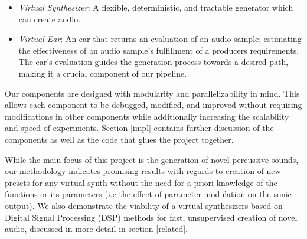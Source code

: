 \documentclass[\main/thesis.tex]{subfiles}
\begin{document}
\begin{itemize}
    \item \textit{Virtual Synthesizer}: A flexible, deter\-min\-istic, and tract\-able gener\-ator which can create audio. 
    \item \textit{Virtual Ear}: An ear that returns an evaluation of an audio sample; estimating the effectiveness of an audio sample's fulfillment of a producers requirements. The ear's evaluation guides the generation process towards a desired path, making it a crucial component of our pipeline. 
\end{itemize}
Our components are designed with modularity and parallelizability in mind. This allows each component to be debugged, modified, and improved without requiring modifications in other components while additionally increasing the scalability and speed of experiments. 
Section \ref{impl} contains further discussion of the components as well as the code that glues the project together.

While the main focus of this project is the generation of novel percussive sounds, our methodology indicates promising results with regards to creation of new presets for any virtual synth without the need for a-priori knowledge of the functions or its parameters (i.e the effect of parameter modulation on the sonic output). We also demonstrate the viability of a virtual synthesizers based on Digital Signal Processing (DSP) methods for fast, unsupervised creation of novel audio, discussed in more detail in section \ref{related}. 
\end{document}
